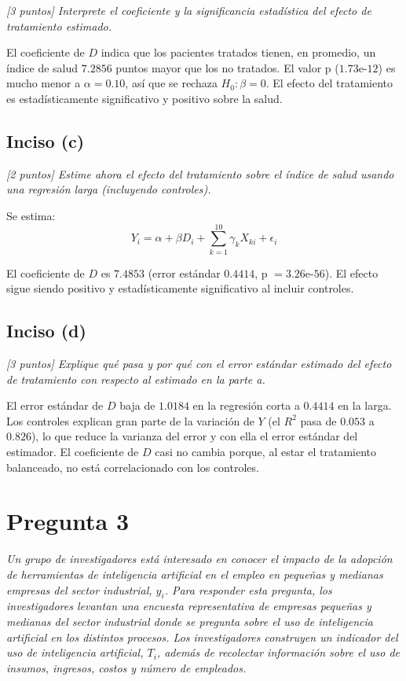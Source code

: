 \documentclass[12pt]{article}
\begin{document}
\textit{[3 puntos] Interprete el coeficiente y la significancia estadística del efecto de tratamiento estimado.}

El coeficiente de $D$ indica que los pacientes tratados tienen, en promedio, un índice de salud $7.2856$ puntos mayor que los no tratados. El valor p ($1.73\text{e-}12$) es mucho menor a $\alpha = 0.10$, así que se rechaza $H_0: \beta = 0$. El efecto del tratamiento es estadísticamente significativo y positivo sobre la salud.

\subsection*{Inciso (c)}

\textit{[2 puntos] Estime ahora el efecto del tratamiento sobre el índice de salud usando una regresión larga (incluyendo controles).}

Se estima:
\begin{equation}
Y_i = \alpha + \beta D_i + \sum_{k=1}^{10} \gamma_k X_{ki} + \epsilon_i
\end{equation}



El coeficiente de $D$ es $7.4853$ (error estándar $0.4414$, p $= 3.26\text{e-}56$). El efecto sigue siendo positivo y estadísticamente significativo al incluir controles.

\subsection*{Inciso (d)}

\textit{[3 puntos] Explique qué pasa y por qué con el error estándar estimado del efecto de tratamiento con respecto al estimado en la parte a.}

El error estándar de $D$ baja de $1.0184$ en la regresión corta a $0.4414$ en la larga. Los controles explican gran parte de la variación de $Y$ (el $R^2$ pasa de $0.053$ a $0.826$), lo que reduce la varianza del error y con ella el error estándar del estimador. El coeficiente de $D$ casi no cambia porque, al estar el tratamiento balanceado, no está correlacionado con los controles.

\section{Pregunta 3}

\textit{Un grupo de investigadores está interesado en conocer el impacto de la adopción de herramientas de inteligencia artificial en el empleo en pequeñas y medianas empresas del sector industrial, $y_i$. Para responder esta pregunta, los investigadores levantan una encuesta representativa de empresas pequeñas y medianas del sector industrial donde se pregunta sobre el uso de inteligencia artificial en los distintos procesos. Los investigadores construyen un indicador del uso de inteligencia artificial, $T_i$, además de recolectar información sobre el uso de insumos, ingresos, costos y número de empleados.}
\end{document}
